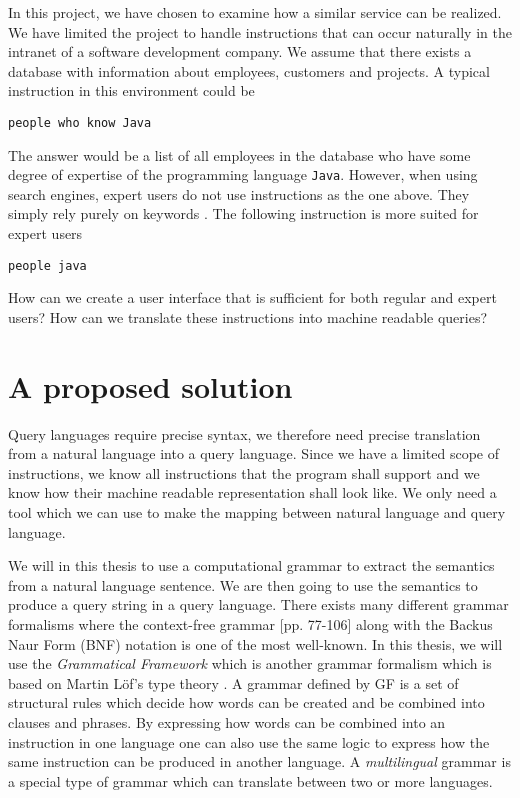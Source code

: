 In this project, we have chosen to examine how a similar service can be realized. We have limited the project to handle instructions that can occur naturally in the intranet of a software development company. We assume that there exists a database with information about employees, customers and projects. A typical instruction in this environment could be

\begin{verbatim}
people who know Java
\end{verbatim}

The answer would be a list of all employees in the database who have some degree of expertise of the programming language \texttt{Java}. However, when using search engines, expert users do not use instructions as the one above. They simply rely purely on keywords \cite{mayer:2007}. The following instruction is more suited for expert users

\begin{verbatim}
people java
\end{verbatim}

How can we create a user interface that is sufficient for both regular and expert users? How can we translate these instructions into machine readable queries?

\section{A proposed solution}
Query languages require precise syntax, we therefore need precise translation from a natural language into a query language. Since we have a limited scope of instructions, we know all instructions that the program shall support and we know how their machine readable representation shall look like. We only need a tool which we can use to make the mapping between natural language and query language. 

We will in this thesis to use a computational grammar to extract the semantics from a natural language sentence. We are then going to use the semantics to produce a query string in a query language.
\newline
\newline
There exists many different grammar formalisms where the context-free grammar \cite{Hopcroft:1990:IAT:574901}[pp. 77-106] along with the Backus Naur Form (BNF) notation \cite{DBLP:journals/cacm/Backus78} is one of the most well-known. In this thesis, we will use the \emph{Grammatical Framework} which is another grammar formalism \cite{ranta:2004} which is based on Martin Löf's type theory \cite{Martin-Löf_anintuitionistic}.
\newline
\newline
A grammar defined by GF is a set of structural rules which decide how words can be created and be combined into clauses and phrases. By expressing how words can be combined into an instruction in one language one can also use the same logic to express how the same instruction can be produced in another language. A \emph{multilingual} grammar is a special type of grammar which can translate between two or more languages.

